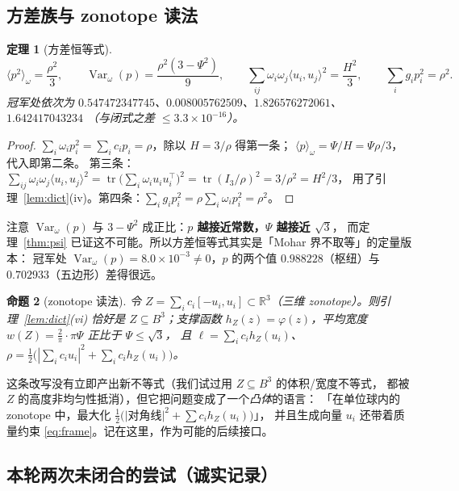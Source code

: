 \documentclass[UTF8,11pt]{ctexart}
\newtheorem{theorem}{定理}[section]
\newtheorem{proposition}[theorem]{命题}
\theoremstyle{definition}
\newcommand{\tr}{\operatorname{tr}}
\newcommand{\R}{\mathbb{R}}
\begin{document}
\subsection{方差族与 zonotope 读法}\label{sec:harm:var}

\begin{theorem}[方差恒等式]\label{thm:variance}
\[
\langle p^2\rangle_\omega=\frac{\rho^2}3,\qquad
\operatorname{Var}_\omega(p)=\frac{\rho^2(3-\Psi^2)}9,\qquad
\sum_{ij}\omega_i\omega_j\langle u_i,u_j\rangle^2=\frac{H^2}3,\qquad
\sum_ig_ip_i^2=\rho^2 .
\]
冠军处依次为 $0.547472347745$、$0.008005762509$、$1.826576272061$、$1.642417043234$
（与闭式之差 $\le3.3\times10^{-16}$）。
\end{theorem}

\begin{proof}
$\sum_i\omega_ip_i^2=\sum_ic_ip_i=\rho$，除以 $H=3/\rho$ 得第一条；
$\langle p\rangle_\omega=\Psi/H=\Psi\rho/3$，代入即第二条。
第三条：$\sum_{ij}\omega_i\omega_j\langle u_i,u_j\rangle^2
=\tr\bigl(\sum_i\omega_iu_iu_i^\top\bigr)^2=\tr(I_3/\rho)^2=3/\rho^2=H^2/3$，
用了引理~\ref{lem:dict}(iv)。第四条：$\sum_ig_ip_i^2=\rho\sum_i\omega_ip_i^2=\rho^2$。
\end{proof}

注意 $\operatorname{Var}_\omega(p)$ 与 $3-\Psi^2$ 成正比：\textbf{$p$ 越接近常数，$\Psi$ 越接近 $\sqrt3$}，
而定理~\ref{thm:psi} 已证这不可能。所以方差恒等式其实是「Mohar 界不取等」的定量版本：
冠军处 $\operatorname{Var}_\omega(p)=8.0\times10^{-3}\ne0$，$p$ 的两个值
$0.988228$（枢纽）与 $0.702933$（五边形）差得很远。

\begin{proposition}[zonotope 读法]\label{prop:zonotope}
令 $Z=\sum_ic_i[-u_i,u_i]\subset\R^3$（三维 zonotope）。则引理~\ref{lem:dict}(vi) 恰好是
$Z\subseteq B^3$；支撑函数 $h_Z(z)=\varphi(z)$，平均宽度 $w(Z)=\frac2\pi\cdot\pi\Psi$ 正比于 $\Psi\le\sqrt3$，
且 $\ell=\sum_ic_ih_Z(u_i)$、$\rho=\frac12\bigl(|\sum_ic_iu_i|^2+\sum_ic_ih_Z(u_i)\bigr)$。
\end{proposition}

这条改写没有立即产出新不等式（我们试过用 $Z\subseteq B^3$ 的体积/宽度不等式，
都被 $Z$ 的高度非均匀性抵消），但它把问题变成了一个\emph{凸体}的语言：
「在单位球内的 zonotope 中，最大化 $\frac12(|$对角线$|^2+\sum c_ih_Z(u_i))$」，
并且生成向量 $u_i$ 还带着质量约束 \eqref{eq:frame}。记在这里，作为可能的后续接口。

\subsection{本轮两次未闭合的尝试（诚实记录）}\label{sec:harm:fail}
\end{document}
